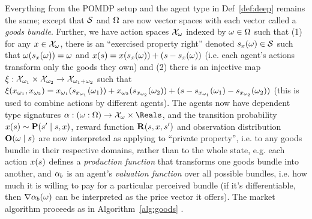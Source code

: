 

\begin{definition}
  Everything from the POMDP setup and the agent type in Def~\ref{def:deep} remains the same; except that $\mathcal{S}$ and $\Omega$ are now vector spaces with each vector called a \emph{goods bundle}. Further, we have action spaces $\mathcal{X}_\omega$ indexed by $\omega\in\Omega$ such that (1) for any $x\in\mathcal{X}_\omega$, there is an ``exercised property right'' denoted $s_x(\omega)\in\mathcal{S}$ such that $\omega(s_x(\omega))=\omega$ and $x(s)=x(s_x(\omega))+(s-s_x(\omega))$ (i.e. each agent's actions transform only the goods they own) and (2) there is an injective map $\xi:\mathcal{X}_{\omega_1}\times\mathcal{X}_{\omega_2}\to\mathcal{X}_{\omega_1+\omega_2}$ such that $\xi(x_{\omega_1}, x_{\omega_2})=x_{\omega_1}(s_{x_{\omega_1}}(\omega_1))+x_{\omega_2}(s_{x_{\omega_2}}(\omega_2))+(s-s_{x_{\omega_1}}(\omega_1)-s_{x_{\omega_2}}(\omega_2))$ (this is used to combine actions by different agents). The agents now have dependent type signatures $\agent:(\obs:\obss)\to\actions_\obs\times\Reals$, and the transition probability $x(s)\sim\mathbf{P}(s'\mid s,x)$, reward function $\mathbf{R}(s,x,s')$ and observation distribution $\mathbf{O}(\omega\mid s)$ are now interpreted as applying to ``private property'', i.e. to any goods bundle in their respective domains, rather than to the whole state, e.g. each action $x(s)$ defines a \emph{production function} that transforms one goods bundle into another, and ${\alpha}_b$ is an agent's \emph{valuation function} over all possible bundles, i.e. how much it is willing to pay for a particular perceived bundle (if it's differentiable, then $\nabla{\alpha}_b(\omega)$ can be interpreted as the price vector it offers). The market algorithm proceeds as in Algorithm~\ref{alg:goods} .

\end{definition}
